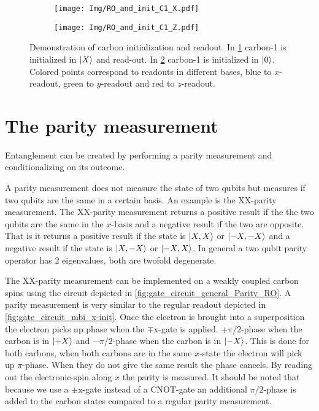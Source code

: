 \begin{figure}[htbp]
    \begin{subfigure}[t]{0.49\textwidth}\centering
        \caption{}
        \texttt{[image: Img/RO\_and\_init\_C1\_X.pdf]}
        \label{fig:carbon_init_x}
    \end{subfigure}
        \begin{subfigure}[t]{0.49\textwidth}\centering
        \caption{}
        \texttt{[image: Img/RO\_and\_init\_C1\_Z.pdf]}
        \label{fig:carbon_init_Z}
    \end{subfigure}
    \caption{Demonstration of carbon initialization and readout. In \cref{fig:carbon_init_x} carbon-1 is initialized in ${\left\vert{X}\right\rangle}$ and read-out. In \cref{fig:carbon_init_Z} carbon-1 is initialized in ${\left\vert{0}\right\rangle}$. Colored points correspond to readouts in different bases, blue to $x$-readout, green to $y$-readout and red to $z$-readout.}
    \label{fig:single_qubit_initialization}
\end{figure}


\section{The parity measurement}
Entanglement can be created by performing a parity measurement and conditionalizing on its outcome.

A parity measurement does not measure the state of two qubits but measures if  two qubits are the same in a certain basis.
An example is the XX-parity measurement.
The XX-parity measurement returns a positive result if the the two qubits are the same in the $x$-basis and a negative result if the two are opposite.
That is it returns a positive result if the state is ${\left\vert{X,X}\right\rangle}$ or ${\left\vert{-X,-X}\right\rangle}$ and a negative result if the state is ${\left\vert{X,-X}\right\rangle}$ or ${\left\vert{-X,X}\right\rangle}$.
In general a two qubit parity operator has 2 eigenvalues, both are twofold degenerate.

The XX-parity measurement can be implemented on a weakly coupled carbon spins using the circuit depicted in \cref{fig:gate_circuit_general_Parity_RO}.
A parity measurement is very similar to the regular readout depicted in \cref{fig:gate_circuit_mbi_x-init}.
Once the electron is brought into a superposition the electron picks up phase when the $\mp \mathrm{x}$-gate is applied.
$+\pi/2$-phase when the carbon is in ${\left\vert{+X}\right\rangle}$ and $-\pi/2$-phase when the carbon is in ${\left\vert{-X}\right\rangle}$.
This is done for both carbons, when both carbons are in the same $x$-state the electron will pick up $\pi$-phase.
When they do not give the same result the phase cancels.
By reading out the electronic-spin along $x$ the parity is measured.
It should be noted that because we use a $\pm \mathrm{x}$-gate instead of a CNOT-gate an additional $\pi/2$-phase is added to the carbon states compared to a regular parity measurement.


